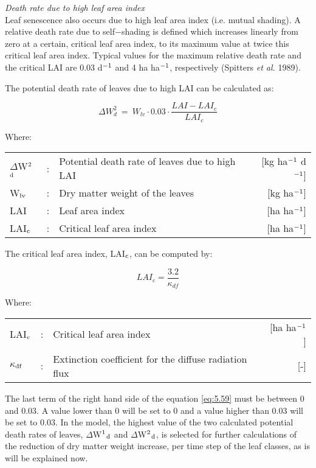 {\it Death rate due to high leaf area index}\\
Leaf senescence also occurs due to high leaf area index (i.e. mutual shading). A relative
death rate due to self$-$shading is defined which increases linearly from zero at a certain,
critical leaf area index, to its maximum value at twice this critical leaf area index. Typical
values for the maximum relative death rate and the critical LAI are 0.03 d$^{{\rm -1}}$ and 4 
ha ha$^{{\rm -}{1}}$, respectively (Spitters {\it et al.} 1989).

The potential death rate of leaves due to high LAI can be calculated as:

\begin{equation}
\label{eq:5.59}
\Delta W_{d}^{2} ~=~ W_{lv} \cdot 0.03 \cdot {\frac{LAI - LAI_c}{LAI_c}}
\end{equation}

Where:\\[5pt]
\begin{tabularx}{\textwidth}{llXr}
	$\Delta$W$^{{\rm 2}}$$_{{\rm d}}$ &:& Potential death rate of leaves due to 
	high LAI   &    [kg ha$^{{\rm -1}}$ d$^{{\rm -1}}$]\\
	W$_{{\rm lv}}$ &:& Dry matter weight of the leaves  &  [kg ha$^{{\rm -1}}$]\\
	LAI &:& Leaf area index   &    [ha ha$^{{\rm -1}}$]\\
	LAI$_{{\rm c}}$ &:& Critical leaf area index   &     [ha ha$^{{\rm -1}}$]\\
\end{tabularx}

The critical leaf area index, LAI$_{{\rm c}}$, can be computed by:

\begin{equation}
LAI_{c} = {\frac{3.2}{\kappa_{df} }}
\end{equation}

Where:\\[5pt]
\begin{tabularx}{\textwidth}{llXr}
	LAI$_{{\rm c}}$ &:& Critical leaf area index    &    [ha ha$^{{\rm -1}}$]\\
	$\kappa$$_{{\rm df}}$ &:& Extinction coefficient for 
	the diffuse radiation flux   &    [-]\\
\end{tabularx}

The last term of the right hand side of the equation \ref{eq:5.59} must be between 0 and 0.03. A 
value lower than 0 will be set to 0 and a value higher than 0.03 will be set to 0.03. In the
model, the highest value of the two calculated potential death rates of leaves, 
$\Delta$W$^{{\rm 1}}$$_{{\rm d}}$ and $\Delta$W$^{{\rm 2}}$$_{{\rm d}}$, is selected 
for further calculations of the reduction of dry matter weight increase,
per time step of the leaf classes, as is will be explained now. 

